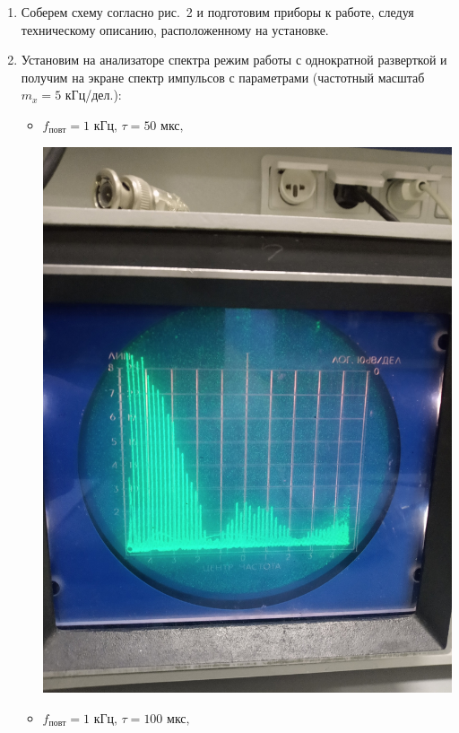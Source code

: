 \documentclass[a4paper, 12pt]{article}
\begin{document}
    \begin{enumerate}
        \item Соберем схему согласно рис.~2 и подготовим приборы к работе, следуя техническому описанию, расположенному на установке.

        \item Установим на анализаторе спектра режим работы с однократной разверткой и получим на экране спектр импульсов с параметрами (частотный масштаб $m_x = 5$ кГц/дел.):

        \begin{itemize}
            \item $f_{повт} = 1 \text{ кГц, } \tau = 50 \text{ мкс, }$
            
            \includegraphics[scale=0.17]{sp1.jpg}

            \item $f_{повт} = 1 \text{ кГц, } \tau = 100 \text{ мкс, }$
            

\end{itemize}
\end{enumerate}
\end{document}
